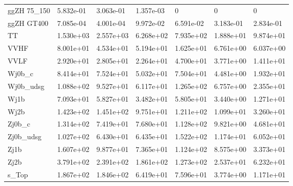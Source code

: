 \begin{table}
{\begin{tabularx}{\textwidth}{|X|X|X|X|X|X|X|}
ggZH 75\_150 & 5.832e-01 & 3.063e-01 & 1.357e-03 & 0 & 0 & 0 \\
ggZH GT400 & 7.085e-04 & 4.001e-04 & 9.972e-02 & 6.591e-02 & 3.183e-01 & 2.834e-01 \\
\hline
TT & 1.530e+03 & 2.557e+03 & 6.268e+02 & 7.935e+02 & 1.888e+01 & 9.874e+01 \\
VVHF & 8.001e+01 & 4.534e+01 & 5.194e+01 & 1.625e+01 & 6.761e+00 & 6.037e+00 \\
VVLF & 2.920e+01 & 2.805e+01 & 2.264e+01 & 4.700e+01 & 3.771e+00 & 1.411e+01 \\
Wj0b\_c & 8.414e+01 & 7.524e+01 & 5.032e+01 & 7.504e+01 & 4.481e+00 & 1.932e+01 \\
Wj0b\_udsg & 1.088e+02 & 9.527e+01 & 6.117e+01 & 1.265e+02 & 6.757e+00 & 2.355e+01 \\
Wj1b & 7.093e+01 & 5.827e+01 & 3.482e+01 & 5.805e+01 & 3.440e+00 & 1.271e+01 \\
Wj2b & 1.423e+02 & 1.451e+02 & 9.751e+01 & 1.211e+02 & 1.099e+01 & 3.260e+01 \\
Zj0b\_c & 1.314e+02 & 7.419e+01 & 7.680e+01 & 1.128e+02 & 9.821e+00 & 4.681e+01 \\
Zj0b\_udsg & 1.027e+02 & 6.430e+01 & 6.435e+01 & 1.522e+02 & 1.174e+01 & 6.052e+01 \\
Zj1b & 1.607e+02 & 9.877e+01 & 7.365e+01 & 1.124e+02 & 8.575e+00 & 3.373e+01 \\
Zj2b & 3.791e+02 & 2.391e+02 & 1.861e+02 & 1.273e+02 & 2.537e+01 & 6.232e+01 \\
s\_Top & 1.867e+02 & 1.846e+02 & 6.419e+01 & 7.596e+01 & 3.774e+00 & 1.171e+01 \\
\hline
\end{tabularx}
}
\label{tab:sr-Znn-2016}
\end{table}

